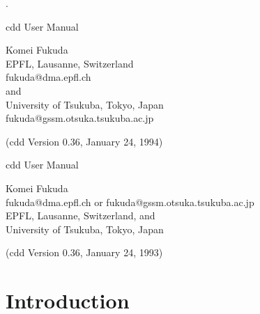 %
\renewcommand{\baselinestretch}{1.0}
\setlength{\oddsidemargin}{8mm}
\setlength{\textwidth}{16cm}
\setlength{\topmargin}{0mm}
\setlength{\textheight}{23cm}
\setlength{\headsep}{0in}
\setlength{\headheight}{0pt}

\pagestyle{empty}



.\vspace{20mm}

\begin{center}



\vspace{20mm}

{\LARGE cdd User Manual}

\vspace{20mm}

{\Large Komei Fukuda\\
   EPFL, Lausanne, Switzerland\\
   fukuda@dma.epfl.ch\\
   and\\
   University of Tsukuba, Tokyo, Japan\\
  fukuda@gssm.otsuka.tsukuba.ac.jp
}

\vspace{20mm}
{\Large (cdd Version 0.36,  January 24, 1994)}

\end{center}

\newpage
\pagestyle{plain}
\setcounter{page}{1} 

\begin{center}

{\Large cdd User Manual}

\bigskip
{\large Komei Fukuda\\
   fukuda@dma.epfl.ch  or  fukuda@gssm.otsuka.tsukuba.ac.jp\\
   EPFL, Lausanne, Switzerland, and\\
   University of Tsukuba, Tokyo, Japan}

\bigskip
{\large (cdd Version 0.36,  January 24, 1993)}

\end{center}

\section{Introduction} \label{INTRODUCTION}

